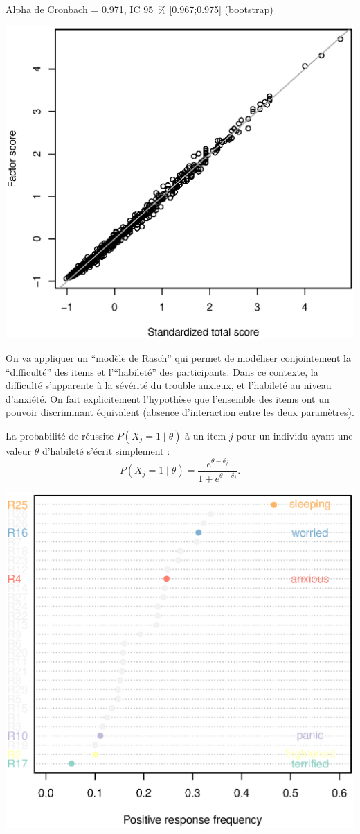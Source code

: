 {\small Alpha de Cronbach = 0.971, IC 95~\% [0.967;0.975] (bootstrap)}



{\centering \includegraphics[width=.5\textwidth]{figs/anxiety_fa_scores.eps}\par}


On va appliquer un \enquote{modèle de Rasch}\autocite{RabeHesketh2008} qui
permet de modéliser conjointement la \enquote{difficulté} des items et
l'\enquote{habileté} des participants. Dans ce contexte, la difficulté
s'apparente à la sévérité du trouble anxieux, et l'habileté au niveau d'anxiété.
On fait explicitement l'hypothèse que l'ensemble des items ont un pouvoir
discriminant équivalent (absence d'interaction entre les deux paramètres).

La probabilité de réussite $P(X_j=1\mid \theta)$ à un item $j$ pour un
individu ayant une valeur $\theta$ d'habileté s'écrit simplement :
\[
P(X_j=1\mid \theta) = \frac{e^{\theta-\delta_j}}{1+e^{\theta-\delta_j}}.
\]


{\centering \includegraphics[width=.5\textwidth]{figs/anxiety_respfreq.eps}\par}

